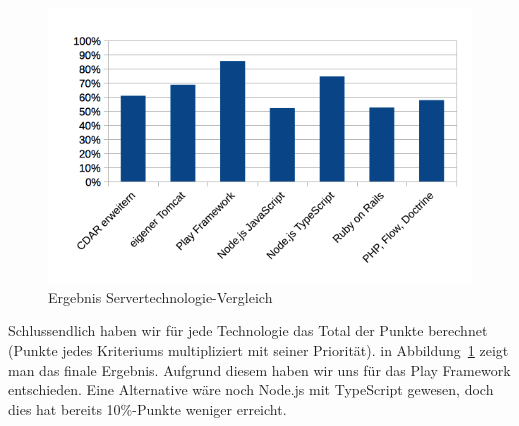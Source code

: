 			\begin{figure}[H]
				\begin{minipage}[b]{\linewidth}
					\includegraphics[width=\textwidth]{media/spreadsheets/ServertechnologieVergleichVergleichDerTechnologienDiagramm.png}
					\centering
					\caption{Ergebnis Servertechnologie-Vergleich}
					\label{fig:ErgebnisServertechnologieVergleich}
				\end{minipage}
			\end{figure}
			
			Schlussendlich haben wir für jede Technologie das Total der Punkte berechnet (Punkte jedes Kriteriums multipliziert mit seiner Priorität). in Abbildung~\ref{fig:ErgebnisServertechnologieVergleich} zeigt man das finale Ergebnis. Aufgrund diesem haben wir uns für das Play Framework entschieden. Eine Alternative wäre noch Node.js mit TypeScript gewesen, doch dies hat bereits 10\%-Punkte weniger erreicht.
			
